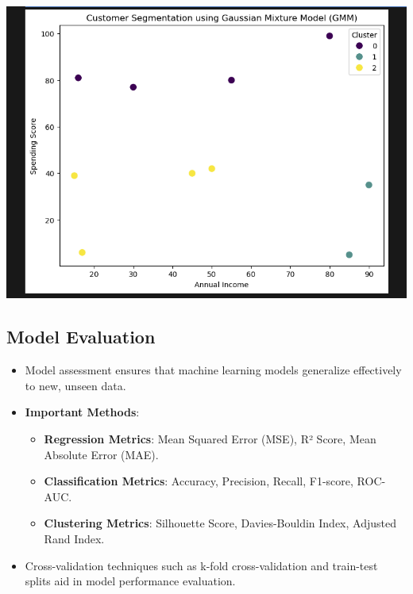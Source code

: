 \documentclass{article}
\begin{document}
\begin{itemize}
\begin{itemize}
\includegraphics[width=14cm,height=8
cm]{Gaussia_Output.png}
    \end{itemize}
\end{itemize}
\subsection{Model Evaluation}
\begin{itemize}
    \item Model assessment ensures that machine learning models generalize effectively to new, unseen data.
    \item \textbf{Important Methods}:
    \begin{itemize}
    \item \textbf{Regression Metrics}: Mean Squared Error (MSE), R² Score, Mean Absolute Error (MAE).
    \item \textbf{Classification Metrics}: Accuracy, Precision, Recall, F1-score, ROC-AUC.
    \item \textbf{Clustering Metrics}: Silhouette Score, Davies-Bouldin Index, Adjusted Rand Index.
    \end{itemize}
    \item Cross-validation techniques such as k-fold cross-validation and train-test splits aid in model performance evaluation.
\end{itemize}
\end{document}
